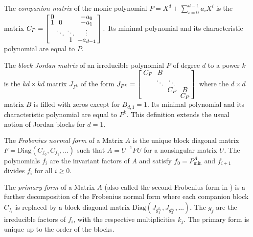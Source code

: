 \documentclass{article}
\newcommand{\minpoly}{{P_\text{min}^A}}
\begin{document}
The \textit{companion matrix} of the monic polynomial 
$P=X^d + \sum_{i=0}^{d-1} a_i X^i$ is the matrix
{\scriptsize
$
\renewcommand{\arraystretch}{.6}
\setlength{\arraycolsep}{.35\arraycolsep}
C_P = 
\left[\begin{array}{cccc}
0&      &     & -a_0\\
1&0     &     & -a_1\\
 &\ddots&\ddots&\vdots\\
 &      &  1   &-a_{d-1}
\end{array}\right].
$}
Its minimal polynomial and its characteristic polynomial are equal to $P$.

The \textit{block Jordan matrix} of an irreducible polynomial $P$ of degree $d$ to a
power $k$ is the $kd\times kd$ matrix $J_{P^k}$ of the form
$
J_{P^k}=
\renewcommand{\arraystretch}{.5}
\setlength{\arraycolsep}{.5\arraycolsep}
\left[\begin{array}{cccc}
  C_P&B&&\\
  &\ddots&\ddots&\\
  &&C_P&B\\
  &&&C_P
\end{array}\right]
$
where the $d\times d$ matrix $B$ is filled with zeros except for $B_{d,1}=1$.
Its minimal polynomial and its characteristic polynomial are equal to $P^k$.
This definition extends the usual notion of Jordan blocks for $d=1$.
 
The \textit{Frobenius normal form} of a Matrix $A$ is the unique  block diagonal matrix
$F=\text{Diag}(C_{f_0},C_{f_1},\dots)$ such that $A=U^{-1}FU$ for a nonsingular matrix
$U$. The polynomials $f_i$ are the invariant factors of $A$ and satisfy $f_0 =
\minpoly$ and $f_{i+1}$ divides $f_{i}$ for all $i\geq0$.

The \textit{primary form} of a Matrix $A$ (also called the second Frobenius form in
\cite{Gantmacher:1959:TMone}) is a further decomposition of the Frobenius
normal form where each companion block $C_{f_i}$ is replaced by a block
diagonal matrix  $\text{Diag}(J_{g_1^{k_1}}, J_{g_2^{k_2}},\dots)$. 
  The $g_j$ are the irreducible factors of $f_i$, with the respective
  multiplicities $k_j$. 
The primary form is unique up to the order of the blocks. 
\end{document}
